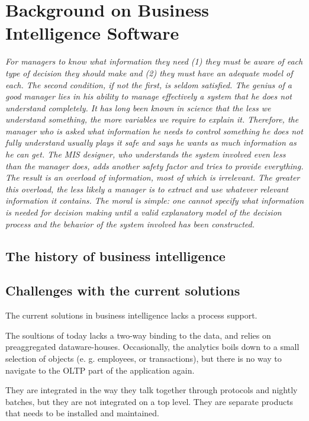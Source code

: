 \section{Background on Business Intelligence Software}
\label{sec:bi-background}
\textit{For managers to know what information they need (1) they must be aware of each type of decision they should make and (2) they must have an adequate model of each. The second condition, if not the first, is seldom satisfied. The genius of a good manager lies in his ability to manage effectively a system that he does not understand completely. It has long been known in science that the less we understand something, the more variables we require to explain it. Therefore, the manager who is asked what information he needs to control something he does not fully understand usually plays it safe and says he wants as much information as he can get. The MIS designer, who understands the system involved even less than the manager does, adds another safety factor and tries to provide everything. The result is an overload of information, most of which is irrelevant. The greater this overload, the less likely a manager is to extract and use whatever relevant information it contains. The moral is simple: one cannot specify what information is needed for decision making until a valid explanatory model of the decision process and the behavior of the system involved has been constructed.}


\subsection{The history of business intelligence}


\subsection{Challenges with the current solutions}
The current solutions in business intelligence lacks a process support.

The soultions of today lacks a two-way binding to the data, and relies on preaggregated dataware-houses. Occasionally, the analytics boils down to a small selection of objects (e. g. employees, or transactions), but there is no way to navigate to the OLTP part of the application again.

They are integrated in the way they talk together through protocols and nightly batches, but they are not integrated on a top level. They are separate products that needs to be installed and maintained.

